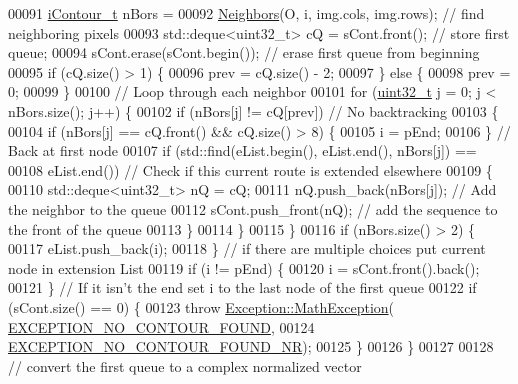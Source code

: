 \begin{DoxyCode}
00091     \hyperlink{_soil_math_types_8h_a1ade796add2f13888dfa9e6bde0bdc37}{iContour\_t} nBors =
00092         \hyperlink{class_soil_math_1_1_f_f_t_a45b32ad009154112d2fc4e467fc7c5ac}{Neighbors}(O, i, img.cols, img.rows); \textcolor{comment}{// find neighboring pixels}
00093     std::deque<uint32\_t> cQ = sCont.front(); \textcolor{comment}{// store first queue;}
00094     sCont.erase(sCont.begin());              \textcolor{comment}{// erase first queue from beginning}
00095     \textcolor{keywordflow}{if} (cQ.size() > 1) \{
00096       prev = cQ.size() - 2;
00097     \} \textcolor{keywordflow}{else} \{
00098       prev = 0;
00099     \}
00100     \textcolor{comment}{// Loop through each neighbor}
00101     \textcolor{keywordflow}{for} (\hyperlink{_soil_math_types_8h_a435d1572bf3f880d55459d9805097f62}{uint32\_t} j = 0; j < nBors.size(); j++) \{
00102       \textcolor{keywordflow}{if} (nBors[j] != cQ[prev]) \textcolor{comment}{// No backtracking}
00103       \{
00104         \textcolor{keywordflow}{if} (nBors[j] == cQ.front() && cQ.size() > 8) \{
00105           i = pEnd;
00106         \} \textcolor{comment}{// Back at first node}
00107         \textcolor{keywordflow}{if} (std::find(eList.begin(), eList.end(), nBors[j]) ==
00108             eList.end()) \textcolor{comment}{// Check if this current route is extended elsewhere}
00109         \{
00110           std::deque<uint32\_t> nQ = cQ;
00111           nQ.push\_back(nBors[j]); \textcolor{comment}{// Add the neighbor to the queue}
00112           sCont.push\_front(nQ);   \textcolor{comment}{// add the sequence to the front of the queue}
00113         \}
00114       \}
00115     \}
00116     \textcolor{keywordflow}{if} (nBors.size() > 2) \{
00117       eList.push\_back(i);
00118     \} \textcolor{comment}{// if there are multiple choices put current node in extension List}
00119     \textcolor{keywordflow}{if} (i != pEnd) \{
00120       i = sCont.front().back();
00121     \} \textcolor{comment}{// If it isn't the end set i to the last node of the first queue}
00122     \textcolor{keywordflow}{if} (sCont.size() == 0) \{
00123       \textcolor{keywordflow}{throw} \hyperlink{class_soil_math_1_1_exception_1_1_math_exception}{Exception::MathException}(
      \hyperlink{_math_exception_8h_a39b49da54ac54198f948ea87cd429c1c}{EXCEPTION\_NO\_CONTOUR\_FOUND},
00124                                      \hyperlink{_math_exception_8h_a3c2849e602d9d4c0dba3f2d3301d9cbf}{EXCEPTION\_NO\_CONTOUR\_FOUND\_NR});
00125     \}
00126   \}
00127 
00128   \textcolor{comment}{// convert the first queue to a complex normalized vector}

\end{DoxyCode}
